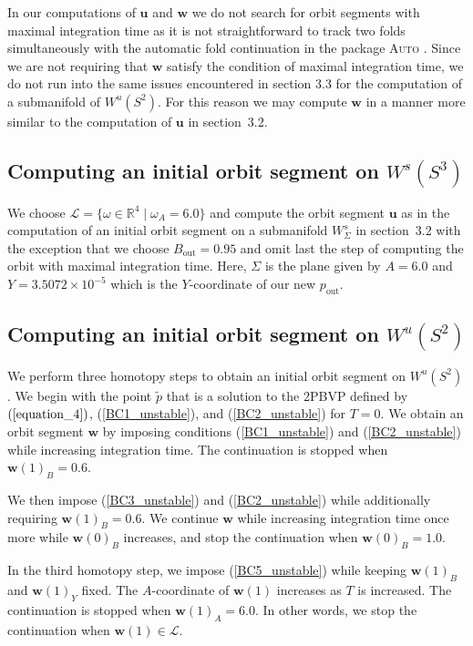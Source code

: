 \documentclass{ws-ijbc}
\begin{document}
In our computations of $\mathbf{u}$ and $\mathbf{w}$ we do not search for orbit segments with maximal integration time as it is not straightforward to track two folds simultaneously with the automatic fold continuation in the package \textsc{Auto} \cite{AUTO}.  Since we are not requiring that $\mathbf{w}$ satisfy the condition of maximal integration time, we do not run into the same issues encountered in section 3.3 for the computation of a submanifold of $W^u(S^2)$.  For this reason we may compute $\mathbf{w}$ in a manner more similar to the computation of $\mathbf{u}$ in section~3.2.

\subsection{Computing an initial orbit segment on $W^s(S^3)$}

We choose $\mathscr{L} = \{\omega \in \mathbb{R}^4 \; | \; \omega_A = 6.0 \}$ and compute the orbit segment $\mathbf{u}$ as in the computation of an initial orbit segment on a submanifold $W^s_{\Sigma}$ in section~3.2 with the exception that we choose $B_{\text{out}}=0.95$ and omit last the step of computing the orbit with maximal integration time.  Here, $\Sigma$ is the plane given by $A=6.0$ and $Y=3.5072 \times 10^{-5}$ which is the $Y$-coordinate of our new $p_{\text{out}}$.

\subsection{Computing an initial orbit segment on $W^u(S^2)$}

We perform three homotopy steps to obtain an initial orbit segment on $W^u(S^2)$.  We begin with the point $\tilde{p}$ that is a solution to the 2PBVP defined by $(\ref{equation_4})$, (\ref{BC1_unstable}), and (\ref{BC2_unstable}) for $T=0$.  We obtain an orbit segment $\mathbf{w}$ by imposing conditions (\ref{BC1_unstable}) and (\ref{BC2_unstable}) while increasing integration time.  The continuation is stopped when $\mathbf{w}(1)_B = 0.6$.

We then impose (\ref{BC3_unstable}) and (\ref{BC2_unstable}) while additionally requiring $\mathbf{w}(1)_B=0.6$.  We continue $\mathbf{w}$ while increasing integration time once more while $\mathbf{w}(0)_B$ increases, and stop the continuation when $\mathbf{w}(0)_B=1.0$.

In the third homotopy step, we impose (\ref{BC5_unstable}) while keeping $\mathbf{w}(1)_B$ and $\mathbf{w}(1)_Y$ fixed.  The $A$-coordinate of $\mathbf{w}(1)$ increases as $T$ is increased.  The continuation is stopped when $\mathbf{w}(1)_A = 6.0$.  In other words, we stop the continuation when $\mathbf{w}(1) \in \mathscr{L}$.
\end{document}
